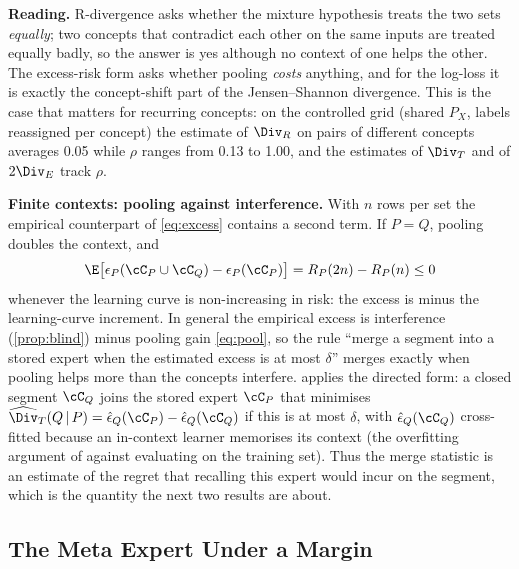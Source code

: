 \textbf{Reading.} R-divergence asks whether the mixture hypothesis treats the two sets \emph{equally}; two concepts
that contradict each other on the same inputs are treated equally badly, so the answer is yes although no context
of one helps the other. The excess-risk form asks whether pooling \emph{costs} anything, and for the log-loss it is
exactly the concept-shift part of the Jensen--Shannon divergence. This is the case that matters for recurring
concepts: on the controlled grid (shared $P_X$, labels reassigned per concept) the estimate of $\Div_R$ on pairs of
different concepts averages 0.05 while $\rho$ ranges from 0.13 to 1.00, and the estimates of $\Div_T$ and of
$2\Div_E$ track $\rho$.

\textbf{Finite contexts: pooling against interference.} With $n$ rows per set the empirical counterpart of
\eqref{eq:excess} contains a second term. If $P=Q$, pooling doubles the context, and
\begin{equation}\label{eq:pool}
  \E\bigl[\epsilon_P(\cC_P\cup\cC_Q)-\epsilon_P(\cC_P)\bigr]=R_P(2n)-R_P(n)\le0
\end{equation}
whenever the learning curve is non-increasing in risk: the excess is minus the learning-curve increment. In general
the empirical excess is interference (\cref{prop:blind}) minus pooling gain \eqref{eq:pool}, so the rule ``merge a
segment into a stored expert when the estimated excess is at most $\delta$'' merges exactly when pooling helps more
than the concepts interfere. \method{} applies the directed form: a closed segment $\cC_Q$ joins the stored expert
$\cC_P$ that minimises $\widehat{\Div}_T(Q\,|\,P)=\hat\epsilon_{Q}(\cC_P)-\hat\epsilon_{Q}(\cC_Q)$ if this is at most
$\delta$, with $\hat\epsilon_Q(\cC_Q)$ cross-fitted because an in-context learner memorises its context (the
overfitting argument of \citet{zhao2023rdiv} against evaluating on the training set). Thus the merge statistic is an
estimate of the regret that recalling this expert would incur on the segment, which is the quantity the next two
results are about.

\subsection{The Meta Expert Under a Margin}

